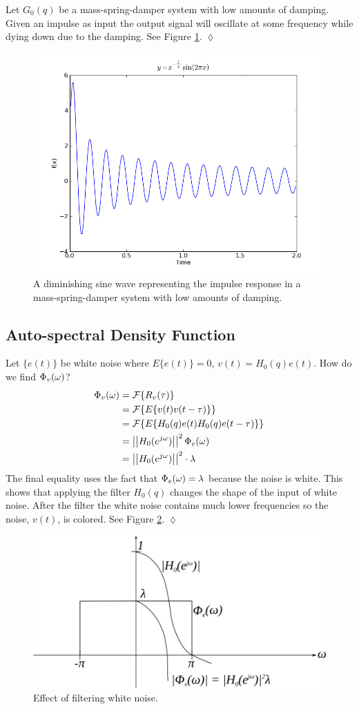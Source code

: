 \begin{example}
Let $G_0(q)$ be a mass-spring-damper system with low amounts of damping. Given an impulse as input the output signal will oscillate at some frequency while dying down due to the damping. See Figure \ref{fig:04dimSine}.
$\lozenge$
\end{example}
\begin{figure}[ht!]
	\centering
	\includegraphics[width=.5\textwidth]{images/04dimSine}
	\caption{A diminishing sine wave representing the impulse response in a mass-spring-damper system with low amounts of damping.}
	\label{fig:04dimSine}
\end{figure}

\subsection{Auto-spectral Density Function}
\begin{example}
Let $\{e(t)\}$ be white noise where $E\{e(t)\}=0$, $v(t)=H_0(q)e(t)$. How do we find $\Phi_v(\omega)$?
\begin{align*}
\Phi_v(\omega) &= \mathcal{F}\{R_v(\tau)\} \\
&= \mathcal{F}\{E\{v(t)v(t-\tau)\}\} \\
&= \mathcal{F}\{E\{H_0(q)e(t)H_0(q)e(t-\tau)\}\} \\
&= \left|\left|H_0(e^{j\omega})\right|\right|^2\Phi_e(\omega) \\
&= \left|\left|H_0(e^{j\omega})\right|\right|^2\cdot\lambda
\end{align*}
The final equality uses the fact that $\Phi_e(\omega)=\lambda$ because the noise is white. This shows that applying the filter $H_0(q)$ changes the shape of the input of white noise. After the filter the white noise contains much lower frequencies so the noise, $v(t)$, is colored. See Figure \ref{fig:04filteredNoise}.
$\lozenge$
\end{example}
\begin{figure}[ht!]
	\centering
	\includegraphics[width=.7\textwidth]{images/04filteredNoise}
	\caption{Effect of filtering white noise.}
	\label{fig:04filteredNoise}
\end{figure}

